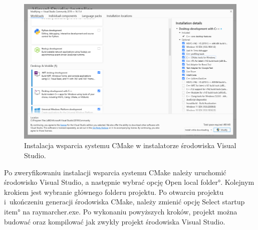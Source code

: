 \begin{figure}
\centering
\includegraphics[width=1\textwidth]{./graf/vscmakeinstall.png}
\caption{Instalacja wsparcia systemu CMake w instalatorze środowiska Visual Studio.}
\label{fig:vs-cmake-install}
\end{figure}

Po zweryfikowaniu instalacji wsparcia systemu CMake należy uruchomić środowisko Visual Studio, a następnie wybrać opcję \ang{Open local folder}. Kolejnym krokiem jest wybranie głównego folderu projektu. Po otwarciu projektu i~ukończeniu generacji środowiska CMake, należy zmienić opcję \ang{Select startup item} na raymarcher.exe. Po wykonaniu powyższych kroków, projekt można budować oraz kompilować jak zwykły projekt środowiska Visual Studio.

